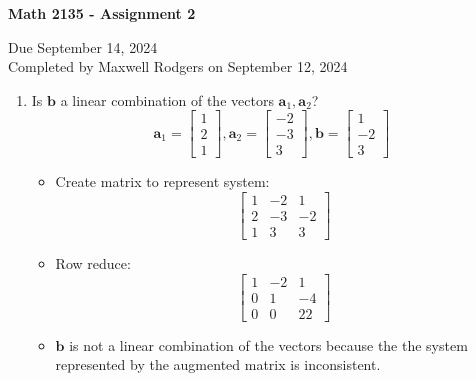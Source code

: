 \documentclass[12pt,a4paper]{exam}
\newcommand{\ba}{\mathbf{a}}
\newcommand{\bb}{\mathbf{b}}
\begin{document}
\begin{center}
\begin{Large}
{\bf Math 2135 - Assignment 2}
\end{Large}

\bigskip
Due September 14, 2024\\
Completed by Maxwell Rodgers on September 12, 2024
\end{center}

\thispagestyle{empty}

\bigskip




\printanswers
\renewcommand{\solutiontitle}{\noindent\textbf{Ans:}\enspace}


\begin{enumerate}

\item
 Is $\bb$ a linear combination of the vectors $\ba_1,\ba_2$?
 \[ \ba_1 = \left[ \begin{array}{c} 1 \\ 2 \\ 1 
\end{array} \right],
\ba_2 = \left[ \begin{array}{c} -2 \\ -3 \\ 3 
\end{array} \right],
\bb = \left[ \begin{array}{c} 1 \\ -2 \\ 3 
\end{array} \right] \]

\begin{solution}
  \begin{itemize}
    \item Create matrix to represent system:\\
      \[
      \left[ \begin{array}{ccc}
          1 & -2 & 1 \\ 2 & -3 & -2 \\ 1 & 3 & 3
      \end{array} \right]
      \]
    \item Row reduce:\\
      \[
      \left[ \begin{array}{ccc}
          1 & -2 & 1 \\ 0 & 1 & -4 \\ 0 & 0 & 22
      \end{array} \right]
      \]
    \item $\bb$ is not a linear combination of the vectors because the the system represented by the augmented matrix is inconsistent.
  \end{itemize}
\end{solution}





\end{enumerate}
\end{document}
